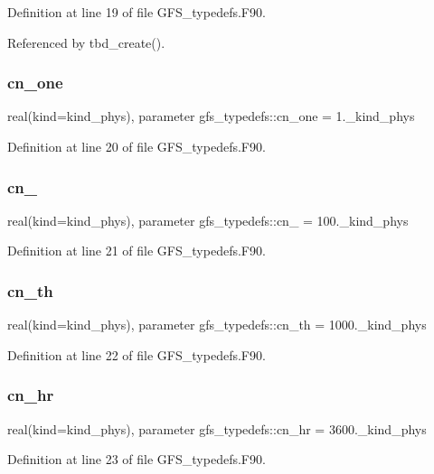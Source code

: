 Definition at line 19 of file G\+F\+S\+\_\+typedefs.\+F90.



Referenced by tbd\+\_\+create().

\mbox{\label{namespacegfs__typedefs_a66b5d9f83b4708e3bca75d11e760ae7d}} 
\subsubsection{cn\+\_\+one}
{\footnotesize\ttfamily real(kind=kind\+\_\+phys), parameter gfs\+\_\+typedefs\+::cn\+\_\+one = 1.\+\_\+kind\+\_\+phys}



Definition at line 20 of file G\+F\+S\+\_\+typedefs.\+F90.

\mbox{\label{namespacegfs__typedefs_ae0adf4dfd445c20f680566a11eacb2da}} 
\subsubsection{cn\+\_}
{\footnotesize\ttfamily real(kind=kind\+\_\+phys), parameter gfs\+\_\+typedefs\+::cn\+\_ = 100.\+\_\+kind\+\_\+phys}



Definition at line 21 of file G\+F\+S\+\_\+typedefs.\+F90.

\mbox{\label{namespacegfs__typedefs_a9e73172adccaeefda76041f572b4bd61}} 
\subsubsection{cn\+\_\+th}
{\footnotesize\ttfamily real(kind=kind\+\_\+phys), parameter gfs\+\_\+typedefs\+::cn\+\_\+th = 1000.\+\_\+kind\+\_\+phys}



Definition at line 22 of file G\+F\+S\+\_\+typedefs.\+F90.

\mbox{\label{namespacegfs__typedefs_a23ba5e46ef854a5bf85a72dc0018e00e}} 
\subsubsection{cn\+\_\+hr}
{\footnotesize\ttfamily real(kind=kind\+\_\+phys), parameter gfs\+\_\+typedefs\+::cn\+\_\+hr = 3600.\+\_\+kind\+\_\+phys}



Definition at line 23 of file G\+F\+S\+\_\+typedefs.\+F90.

